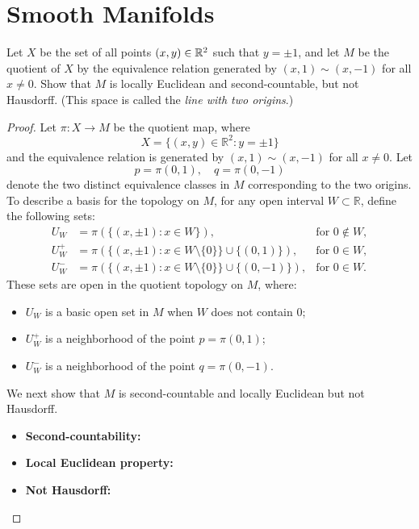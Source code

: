 \chapter{Smooth Manifolds}
\begin{problem}
  Let $ X $ be the set of all points $ (x, y) \in \mathbb{R}^2 $ such that $ y = \pm 1 $, and let $ M $ be the quotient of $ X $ by the equivalence relation generated by $ (x, 1) \sim (x, -1) $ for all $ x \neq 0 $. Show that $ M $ is locally Euclidean and second-countable, but not Hausdorff. (This space is called the \emph{line with two origins}.)
  \begin{proof}
    Let $\pi \colon X \rightarrow M$ be the quotient map, where
    \begin{equation*}
      X = \{(x,y) \in \mathbb{R}^2 : y = \pm 1\}
    \end{equation*}
    and the equivalence relation is generated by $(x,1) \sim (x,-1)$ for all $x \ne 0$.
    Let
    \begin{equation*}
      p = \pi(0,1), \quad q = \pi(0,-1)
    \end{equation*}
    denote the two distinct equivalence classes in $M$ corresponding to the two origins.\\
    To describe a basis for the topology on \(M\), for any open interval \(W \subset \mathbb{R}\), define the following sets:
    \begin{equation*}
      \begin{aligned}
        U_W &= \pi\left( \{(x, \pm 1) : x \in W \} \right), &\text{for } 0 \notin W, \\
        U_W^+ &= \pi\left( \{(x, \pm 1) : x \in W \setminus \{0\} \} \cup \{(0,1)\} \right), & \text{for } 0 \in W, \\
        U_W^- &= \pi\left( \{(x, \pm 1) : x \in W \setminus \{0\} \} \cup \{(0,-1)\} \right), & \text{for } 0 \in W.
      \end{aligned}
    \end{equation*}
    These sets are open in the quotient topology on \(M\), where:
    \begin{itemize}
      \item \(U_W\) is a basic open set in \(M\) when \(W\) does not contain 0;
      \item \(U_W^+\) is a neighborhood of the point \(p = \pi(0,1)\);
      \item \(U_W^-\) is a neighborhood of the point \(q = \pi(0,-1)\).
    \end{itemize}
    We next show that $M$ is second-countable and locally Euclidean but not Hausdorff.
    \begin{itemize}
      \item \textbf{Second-countability:} \\
      
      \item \textbf{Local Euclidean property:} \\
      \item \textbf{Not Hausdorff:} \\
    \end{itemize}
  \end{proof}
\end{problem}

